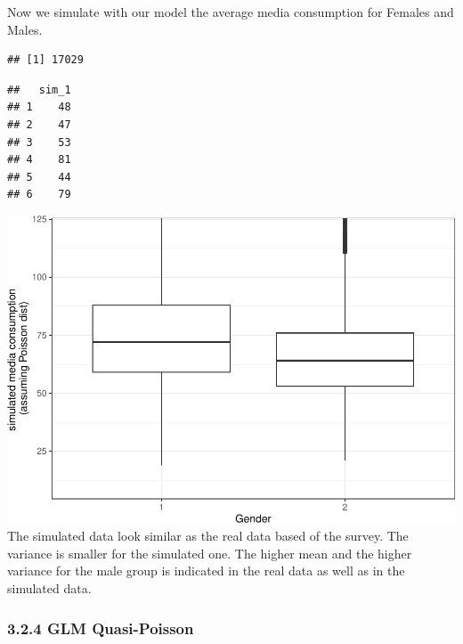 \documentclass[
]{article}
\begin{document}
Now we simulate with our model the average media consumption for Females
and Males.

\begin{verbatim}
## [1] 17029
\end{verbatim}

\begin{verbatim}
##   sim_1
## 1    48
## 2    47
## 3    53
## 4    81
## 5    44
## 6    79
\end{verbatim}

\includegraphics{ESS_DE_files/figure-latex/poisson simulation of data-1.pdf}
The simulated data look similar as the real data based of the survey.
The variance is smaller for the simulated one. The higher mean and the
higher variance for the male group is indicated in the real data as well
as in the simulated data.

\hypertarget{glm-quasi-poisson}{%
\subsubsection{3.2.4 GLM Quasi-Poisson}\label{glm-quasi-poisson}}
\end{document}
